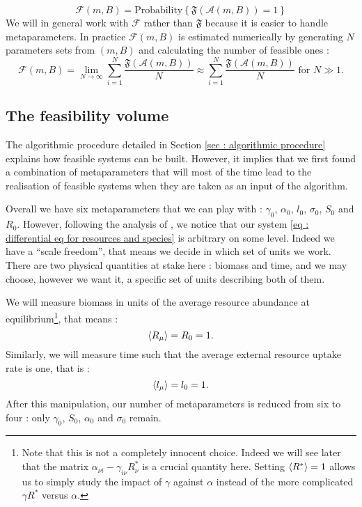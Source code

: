 \documentclass[12pt, titlepage]{report}
\begin{document}
\begin{equation}\boxed{
\mathcal{F}(m, B)=\text{Probability}\left\{\mathfrak{F}\left(\mathcal{A}(m, B)\right)=1\right\}
}
\end{equation}
We will in general work with $\mathcal{F}$ rather than $\mathfrak{F}$ because it is easier to handle metaparameters. In practice $\mathcal{F}(m, B)$ is estimated numerically by generating $N$ parameters sets from $(m,B)$ and calculating the number of feasible ones :
\begin{equation}
\mathcal{F}(m, B) = \lim_{N\rightarrow \infty} \sum_{i=1}^N \frac{\mathfrak{F}(\mathcal{A}(m,B))}{N} \approx \sum_{i=1}^N \frac{\mathfrak{F}(\mathcal{A}(m,B))}{N} \text{ for } N \gg 1.
\end{equation}

\subsection{The feasibility volume}\label{sec : methods feasibility volume}
The algorithmic procedure detailed in Section \ref{sec : algorithmic procedure} explains how feasible systems can be built. However, it implies that we first found a combination of metaparameters that will most of the time lead to the realisation of feasible systems when they are taken as an input of the algorithm.

Overall we have six metaparameters that we can play with : $\gamma_0$, $\alpha_0$, $l_0$, $\sigma_0$, $S_0$ and $R_0$. However, following the analysis of \cite{barbier_cavity_2017}, we notice that our system \eqref{eq : differential eq for resources and species} is arbitrary on some level. Indeed we have a ``scale freedom'', that means we decide in which set of units we work. There are two physical quantities at stake here : biomass and time, and we may choose, however we want it, a specific set of units describing both of them.

We will measure biomass in units of the average resource abundance at equilibrium\footnote{Note that this is not a completely innocent choice. Indeed we will see later that the matrix $\alpha_{\nu i}-\gamma_{i \nu} R^*_\nu$ is a crucial quantity here. Setting $\langle R^* \rangle=1$ allows us to simply study the impact of $\gamma$ against $\alpha$ instead of the more complicated $\gamma R^*$ versus $\alpha$.}, that means :
\begin{equation}
 \langle R_\mu \rangle = R_0 = 1.
\end{equation}
Similarly, we will measure time such that the average external resource uptake rate is one, that is :
\begin{equation}
\langle l_\mu \rangle = l_0 = 1.
\end{equation}
After this manipulation, our number of metaparameters is reduced from six to four : only $\gamma_0$, $S_0$, $\alpha_0$ and $\sigma_0$ remain.
\end{document}
